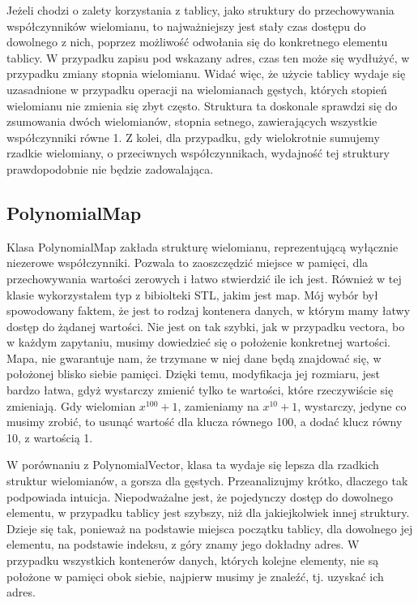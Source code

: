 \documentclass[twoside,a4paper]{book}
\begin{document}
Jeżeli chodzi o zalety korzystania z tablicy, jako struktury do przechowywania współczynników wielomianu, to najważniejszy jest stały czas dostępu do dowolnego z nich, poprzez możliwość odwołania się do konkretnego elementu tablicy. W przypadku zapisu pod wskazany adres, czas ten może się wydłużyć, w przypadku zmiany stopnia wielomianu. Widać więc, że użycie tablicy wydaje się uzasadnione w przypadku operacji na wielomianach gęstych, których stopień wielomianu nie zmienia się zbyt często. Struktura ta doskonale sprawdzi się do zsumowania dwóch wielomianów, stopnia setnego, zawierających wszystkie współczynniki równe 1. Z kolei, dla przypadku, gdy wielokrotnie sumujemy rzadkie wielomiany, o przeciwnych współczynnikach, wydajność tej struktury prawdopodobnie nie będzie zadowalająca.

\subsection{PolynomialMap}

Klasa PolynomialMap zakłada strukturę wielomianu, reprezentującą wyłącznie niezerowe współczynniki.
Pozwala to zaoszczędzić miejsce w pamięci, dla przechowywania wartości zerowych i łatwo stwierdzić ile ich jest. Również w tej klasie wykorzystałem typ z bibiolteki STL, jakim jest map. Mój wybór był spowodowany faktem, że jest to rodzaj kontenera danych, w którym mamy łatwy dostęp do żądanej wartości. Nie jest on tak szybki, jak w przypadku vectora, bo w każdym zapytaniu, musimy dowiedzieć się o położenie konkretnej wartości. Mapa, nie gwarantuje nam, że trzymane w niej dane będą znajdować się, w położonej blisko siebie pamięci. Dzięki temu, modyfikacja jej rozmiaru, jest bardzo łatwa, gdyż wystarczy zmienić tylko te wartości, które rzeczywiście się zmieniają. Gdy wielomian $x^{100} + 1$, zamieniamy na $x^{10} + 1$, wystarczy, jedyne co musimy zrobić, to usunąć wartość dla klucza równego 100, a dodać klucz równy 10, z wartością 1.

W porównaniu z PolynomialVector, klasa ta wydaje się lepsza dla rzadkich struktur wielomianów, a gorsza dla gęstych. Przeanalizujmy krótko, dlaczego tak podpowiada intuicja. Niepodważalne jest, że pojedynczy dostęp do dowolnego elementu, w przypadku tablicy jest szybszy, niż dla jakiejkolwiek innej struktury. Dzieje się tak, ponieważ na podstawie miejsca początku tablicy, dla dowolnego jej elementu, na podstawie indeksu, z góry znamy jego dokładny adres. W przypadku wszystkich kontenerów danych, których kolejne elementy, nie są położone w pamięci obok siebie, najpierw musimy je znaleźć, tj. uzyskać ich adres.
\end{document}

